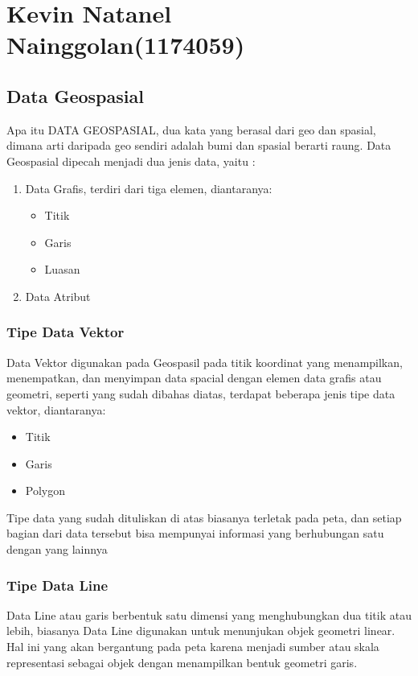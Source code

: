 \section{Kevin Natanel Nainggolan(1174059)}
\subsection{Data Geospasial}
Apa itu DATA GEOSPASIAL, dua kata yang berasal dari geo dan spasial, dimana arti daripada geo sendiri adalah bumi dan spasial berarti raung. Data Geospasial dipecah menjadi dua jenis data, yaitu : 
\begin {enumerate}
	\item Data Grafis, terdiri dari tiga elemen, diantaranya:
		\begin {itemize}
			\item Titik
			\item Garis
			\item Luasan
		\end {itemize}
	\item Data Atribut
\end {enumerate}

\subsubsection{Tipe Data Vektor}
Data Vektor digunakan pada Geospasil pada titik koordinat yang menampilkan, menempatkan, dan menyimpan data spacial dengan elemen data grafis atau geometri, seperti yang sudah dibahas diatas, terdapat beberapa jenis tipe data vektor, diantaranya: 
\begin {itemize}
	\item Titik
	\item Garis
	\item Polygon
\end {itemize}
Tipe data yang sudah dituliskan di atas biasanya terletak pada peta, dan setiap bagian dari data tersebut bisa mempunyai informasi yang berhubungan satu dengan yang lainnya

\subsubsection{Tipe Data Line}
Data Line atau garis berbentuk satu dimensi yang menghubungkan dua titik atau lebih, biasanya Data Line digunakan untuk menunjukan objek geometri linear. Hal ini yang akan bergantung pada peta karena menjadi sumber atau skala representasi sebagai objek dengan menampilkan bentuk geometri garis.

